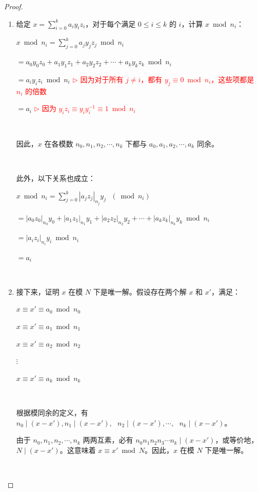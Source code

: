 \begin{proof}

$ $

\begin{enumerate}
\item 给定 $x = \sum\limits_{i=0}^k a_i y_i z_i$，对于每个满足 $0 \leq i \leq k$ 的 $i$，计算 $x \bmod n_i$：

$x \bmod n_i = \sum\limits_{j=0}^k a_j y_j z_j \bmod n_i$

$= a_0 y_0 z_0 + a_1 y_1 z_1 + a_2 y_2 z_2 + \cdots + a_k y_k z_k \bmod n_i$

$= a_i y_i z_i \bmod n_i$ \textcolor{red}{ $\rhd$ 因为对于所有 $j \neq i$，都有 $y_j \equiv 0 \bmod n_i$，这些项都是 $n_i$ 的倍数}

$= a_i$ \textcolor{red}{ $\rhd$ 因为 $y_i z_i \equiv y_i y_i^{-1} \equiv 1 \bmod n_i$}

$ $

因此，$x$ 在各模数 $n_0, n_1, n_2, \cdots, n_k$ 下都与 $a_0, a_1, a_2, \cdots, a_k$ 同余。


$ $

此外，以下关系也成立：

$x \bmod n_i = \sum\limits_{j=0}^k |a_j z_j|_{n_j} y_j \text{ } (\bmod n_i)$

$= |a_0 z_0|_{n_0} y_0 + |a_1 z_1|_{n_1} y_1 + |a_2 z_2|_{n_2} y_2 + \cdots + |a_k z_k|_{n_k} y_k \bmod n_i$

$= |a_i z_i|_{n_i} y_i \bmod n_i$ 

$= a_i$ 

$ $

\item 接下来，证明 $x$ 在模 $N$ 下是唯一解。假设存在两个解 $x$ 和 $x'$，满足：

$x \equiv x' \equiv a_0 \bmod n_0$

$x \equiv x' \equiv a_1 \bmod n_1$

$x \equiv x' \equiv a_2 \bmod n_2$

\text{ } $\vdots$

$x \equiv x' \equiv a_k \bmod n_k$

$ $

根据模同余的定义，有 $ n_0 \mid (x - x') , n_1 \mid (x - x') , \text{ } n_2 \mid (x - x'), \cdots, \text{ } n_k \mid (x - x')$。

由于 $n_0, n_1, n_2, \cdots, n_k$ 两两互素，必有 $n_0n_1n_2n_3\cdots n_k \mid (x - x')$，或等价地，$N \mid (x - x')$。这意味着 $x \equiv x' \bmod N$。因此，$x$ 在模 $N$ 下是唯一解。

$ $


\end{enumerate}
\end{proof}
